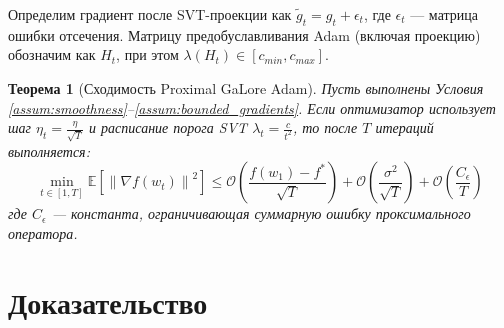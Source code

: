 \documentclass[11pt]{article}
\newtheorem{theorem}{Теорема}
\newcommand{\E}{\mathbb{E}}
\newcommand{\norm}[1]{\left\|#1\right\|}
\begin{document}
Определим градиент после SVT-проекции как $\tilde{g}_t = g_t + \epsilon_t$, где $\epsilon_t$ --- матрица ошибки отсечения. Матрицу предобуславливания Adam (включая проекцию) обозначим как $H_t$, при этом $\lambda(H_t) \in [c_{min}, c_{max}]$.

\begin{theorem}[Сходимость Proximal GaLore Adam]
\label{thm:main_convergence}
Пусть выполнены Условия \ref{assum:smoothness}--\ref{assum:bounded_gradients}. Если оптимизатор использует шаг $\eta_t = \frac{\eta}{\sqrt{T}}$ и расписание порога SVT $\lambda_t = \frac{c}{t^2}$, то после $T$ итераций выполняется:
\begin{equation}
    \min_{t \in [1, T]} \E\left[\norm{\nabla f(w_t)}^2\right] \le \mathcal{O}\left( \frac{f(w_1) - f^*}{\sqrt{T}} \right) + \mathcal{O}\left( \frac{\sigma^2}{\sqrt{T}} \right) + \mathcal{O}\left( \frac{C_{\epsilon}}{T} \right)
\end{equation}
где $C_{\epsilon}$ --- константа, ограничивающая суммарную ошибку проксимального оператора.
\end{theorem}

\section{Доказательство}
\end{document}
